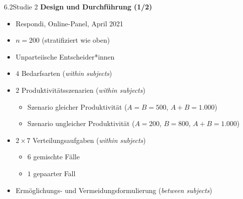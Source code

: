 \documentclass[xcolor=table,9pt,aspectratio=169]{beamer}
\begin{document}
\begin{frame}{\vspace*{10mm}6.2\hspace*{1em}Studie 2}
\textbf{Design und Durchführung (1/2)}\\
\medskip
\begin{itemize}
   \item Respondi, Online-Panel, April 2021
   \item $n=200$ (stratifiziert wie oben)
   \item Unparteiische Entscheider*innen
   \item $4$ Bedarfsarten (\textit{within subjects})
   \item $2$ Produktivitätsszenarien (\textit{within subjects})
   \begin{itemize}
      \item Szenario gleicher Produktivität ($A=B=500$, $A+B=1.000$)
      \item Szenario ungleicher Produktivität ($A=200$, $B=800$, $A+B=1.000$)
   \end{itemize}
   \item $2\times7$ Verteilungsaufgaben (\textit{within subjects})
   \begin{itemize}
      \item $6$ gemischte Fälle
      \item $1$ gepaarter Fall
   \end{itemize}
   \item Ermöglichungs- und Vermeidungsformulierung (\textit{between subjects})
\end{itemize}
\end{frame}
\end{document}
